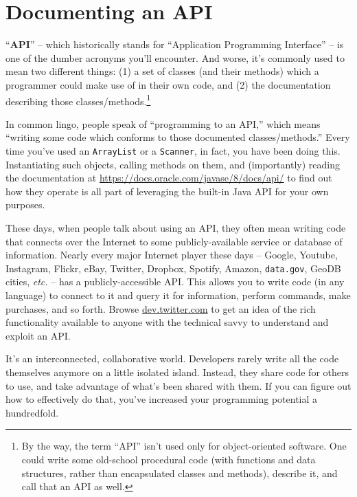 

\chapter{Documenting an API}

``\textbf{API}'' -- which historically stands for ``Application Programming
Interface'' -- is one of the dumber acronyms you'll encounter. And worse, it's
commonly used to mean two different things: (1) a set of classes (and their
methods) which a programmer could make use of in their own code, and (2) the
documentation describing those classes/methods.\footnote{By the way, the term
``API'' isn't used only for object-oriented software. One could write some
old-school procedural code (with functions and data structures, rather than
encapsulated classes and methods), describe it, and call that an API as well.}

In common lingo, people speak of ``programming to an API,'' which means
``writing some code which conforms to those documented classes/methods.'' Every
time you've used an \texttt{ArrayList} or a \texttt{Scanner}, in fact, you
have been doing this. Instantiating such objects, calling methods on them, and
(importantly) reading the documentation at
\url{https://docs.oracle.com/javase/8/docs/api/} to find out how they
operate is all part of leveraging the built-in Java API for your own purposes.

These days, when people talk about using an API, they often mean writing code
that connects over the Internet to some publicly-available service or database
of information. Nearly every major Internet player these days -- Google,
Youtube, Instagram, Flickr, eBay, Twitter, Dropbox, Spotify, Amazon,
\texttt{data.gov}, GeoDB cities, \textit{etc.} -- has a publicly-accessible
API. This allows you to write code (in any language) to connect to it and
query it for information, perform commands, make purchases, and so forth.
Browse \url{dev.twitter.com} to get an idea of the rich functionality
available to anyone with the technical savvy to understand and exploit an API.

It's an interconnected, collaborative world. Developers rarely write all the
code themselves anymore on a little isolated island. Instead, they share code
for others to use, and take advantage of what's been shared with them. If you
can figure out how to effectively do that, you've increased your programming
potential a hundredfold.

